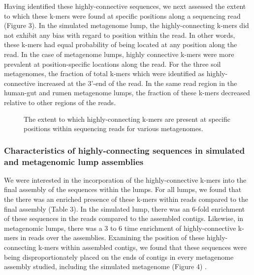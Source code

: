 \documentclass[11pt]{article} %
\begin{document}
Having identified these highly-connective sequences, we next assessed the extent to which these k-mers were found at specific positions along a sequencing read (Figure 3).  In the simulated metagenome lump, the highly-connecting k-mers did not exhibit any bias with regard to position within the read.  In other words, these k-mers had equal probability of being located at any position along the read.  In the case of metagenome lumps, highly connective k-mers were more prevalent at position-specific locations along the read.   For the three soil metagenomes, the fraction of total k-mers which were identified as highly-connective increased at the 3'-end of the read.  In the same read region in the human-gut and rumen metagenome lumps, the fraction of these k-mers decreased relative to other regions of the reads.    

\begin{figure}
\caption{The extent to which highly-connecting k-mers are present at specific positions within sequencing reads for various metagenomes.}
\end{figure}

\subsubsection{Characteristics of highly-connecting sequences in simulated and metagenomic lump assemblies}

We were interested in the incorporation of the highly-connective k-mers into the final assembly of the sequences within the lumps.  For all lumps, we found that the there was an enriched presence of these k-mers within reads compared to the final assembly (Table 3).  In the simulated lump, there was an 6-fold enrichment of these sequences in the reads compared to the assembled contigs.  Likewise, in metagenomic lumps, there was a 3 to 6 time enrichment of highly-connective k-mers in reads over the assemblies.  Examining the position of these highly-connecting k-mers within assembled contigs, we found that these sequences were being disproportionately placed on the ends of contigs in every metagenome assembly studied, including the simulated metagenome (Figure 4) .  
\end{document}
